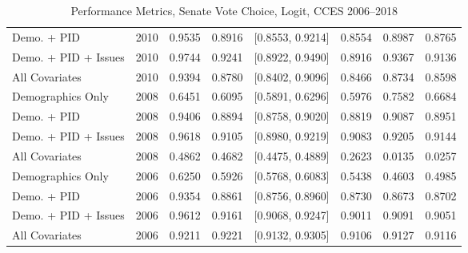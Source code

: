 \begin{table}[H]
\begin{tabular}{lrrrlrrr}
  Demo. + PID & 2010 & 0.9535 & 0.8916 & [0.8553, 0.9214] & 0.8554 & 0.8987 & 0.8765 \\ 
  Demo. + PID + Issues & 2010 & 0.9744 & 0.9241 & [0.8922, 0.9490] & 0.8916 & 0.9367 & 0.9136 \\ 
  All Covariates & 2010 & 0.9394 & 0.8780 & [0.8402, 0.9096] & 0.8466 & 0.8734 & 0.8598 \\ 
  Demographics Only & 2008 & 0.6451 & 0.6095 & [0.5891, 0.6296] & 0.5976 & 0.7582 & 0.6684 \\ 
  Demo. + PID & 2008 & 0.9406 & 0.8894 & [0.8758, 0.9020] & 0.8819 & 0.9087 & 0.8951 \\ 
  Demo. + PID + Issues & 2008 & 0.9618 & 0.9105 & [0.8980, 0.9219] & 0.9083 & 0.9205 & 0.9144 \\ 
  All Covariates & 2008 & 0.4862 & 0.4682 & [0.4475, 0.4889] & 0.2623 & 0.0135 & 0.0257 \\ 
  Demographics Only & 2006 & 0.6250 & 0.5926 & [0.5768, 0.6083] & 0.5438 & 0.4603 & 0.4985 \\ 
  Demo. + PID & 2006 & 0.9354 & 0.8861 & [0.8756, 0.8960] & 0.8730 & 0.8673 & 0.8702 \\ 
  Demo. + PID + Issues & 2006 & 0.9612 & 0.9161 & [0.9068, 0.9247] & 0.9011 & 0.9091 & 0.9051 \\ 
  All Covariates & 2006 & 0.9211 & 0.9221 & [0.9132, 0.9305] & 0.9106 & 0.9127 & 0.9116 \\ 
   \bottomrule
\end{tabular}
\caption{Performance Metrics, Senate Vote Choice, Logit, CCES 2006--2018} 
\label{tab:cces_senate_logit}
\end{table}
